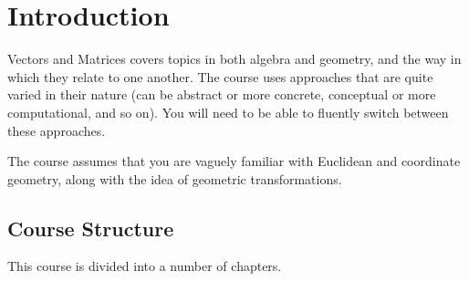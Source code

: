 
\chapter{Introduction}

Vectors and Matrices covers topics in both algebra and geometry, and the way in which they relate to one another. The course uses approaches that are quite varied in their nature (can be abstract or more concrete, conceptual or more computational, and so on). You will need to be able to fluently switch between these approaches.

The course assumes that you are vaguely familiar with Euclidean and coordinate geometry, along with the idea of geometric transformations.

\section{Course Structure}

This course is divided into a number of chapters.

